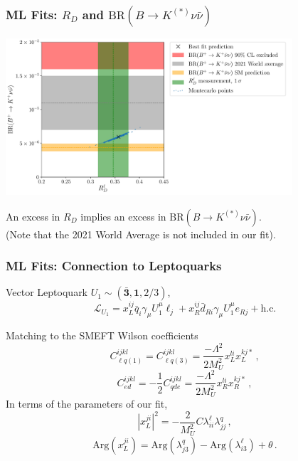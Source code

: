 \documentclass[mathserif, 10pt]{beamer}
\begin{document}
\begin{frame}\frametitle{ML Fits: $R_D$ and $\mathrm{BR}(B\to K^{(*)}\nu\bar{\nu})$}

    \begin{center}
        \includegraphics[width=0.8\textwidth]{figures/RD_BKnunu.pdf}
    \end{center}

    An excess in $R_D$ implies an excess in $\mathrm{BR}(B\to K^{(*)}\nu\bar{\nu})$. \\(Note that the {\color{gray}2021 World Average} is not included in our fit).

\end{frame}

\begin{frame}\frametitle{ML Fits: Connection to Leptoquarks}

    Vector Leptoquark $U_1 \sim (\bar{\mathbf{3}}, \mathbf{1}, 2/3)$,
    $$\mathcal{L}_{U_1} = x_L^{ij} \bar{q}_i \gamma_\mu U_1^\mu \ell_j + x_R^{ij} \bar{d}_{Ri} \gamma_\mu U_1^\mu e_{Rj} + \mathrm{h.c.} $$

    Matching to the SMEFT Wilson coefficients
    $$C_{\ell q(1)}^{ijkl} = C_{\ell q(3)}^{ijkl} = \frac{-\Lambda^2}{2M_U^2}x_L^{li}x_L^{kj*}\,,$$
    $$C_{ed}^{ijkl} = -\frac{1}{2}C_{qde}^{ijkl} = \frac{-\Lambda^2}{2M_U^2}x_R^{li}x_R^{kj*}\,,$$
    In terms of the parameters of our fit,
    $$|x_L^{ji}|^2 = -\frac{2}{M_U^2}C\lambda^\ell_{ii}\lambda^q_{jj}\,,$$
    $$\mathrm{Arg}(x_L^{ji}) = \mathrm{Arg}(\lambda_{j3}^q)-\mathrm{Arg}(\lambda_{i3}^\ell) + \theta\,.$$ %

\end{frame}
\end{document}
